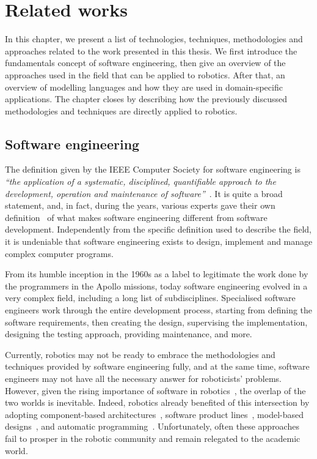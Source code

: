 \chapter[Related works]{Related works}\label{ch:Related}

In this chapter, we present a list of technologies, techniques, methodologies and approaches related to the work presented in this thesis. We first introduce the fundamentals concept of software engineering, then give an overview of the approaches used in the field that can be applied to robotics. After that, an overview of modelling languages and how they are used in domain-specific applications. The chapter closes by describing how the previously discussed methodologies and techniques are directly applied to robotics.

\minitoc
\newpage

\section{Software engineering}
The definition given by the IEEE Computer Society for software engineering is \textit{``the application of a systematic, disciplined, quantifiable approach to the development, operation and maintenance of software''}~\cite{abran2004software}. It is quite a broad statement, and, in fact, during the years, various experts gave their own definition~\cite{sommerville2011software, ieee1990ieee, pressman2005software} of what makes software engineering different from software development. Independently from the specific definition used to describe the field, it is undeniable that software engineering exists to design, implement and manage complex computer programs.

From its humble inception in the 1960s as a label to legitimate the work done by the programmers in the Apollo missions, today software engineering evolved in a very complex field, including a long list of subdisciplines. Specialised software engineers work through the entire development process, starting from defining the software requirements, then creating the design, supervising the implementation, designing the testing approach, providing maintenance, and more.

Currently, robotics may not be ready to embrace the methodologies and techniques provided by software engineering fully, and at the same time, software engineers may not have all the necessary answer for roboticists' problems. However, given the rising importance of software in robotics~\cite{cousins2011exponential}, the overlap of the two worlds is inevitable. Indeed, robotics already benefited of this intersection by adopting component-based architectures~\cite{quigley2009ros, schlegel2014smartmdsd}, software product lines~\cite{gherardi2014modeling}, model-based designs~\cite{diego2010v3cmm}, and automatic programming~\cite{kumar2016rosmod}. Unfortunately, often these approaches fail to prosper in the robotic community and remain relegated to the academic world.

